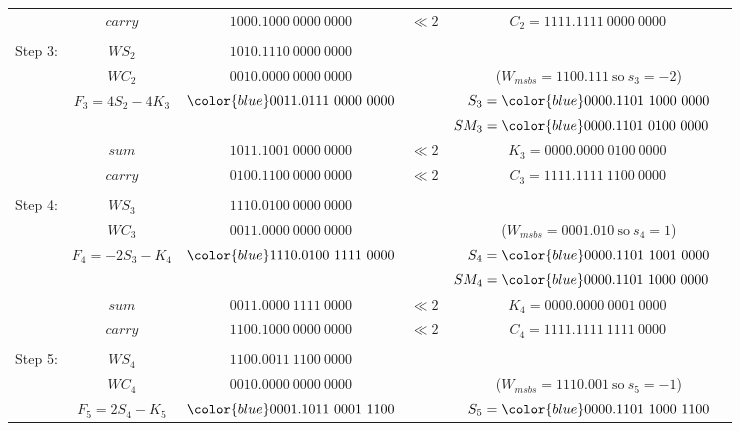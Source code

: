 \documentclass[12pt]{article}
\begin{document}
{\begin{center}
\begin{tabular}{ccccc}
            &$carry         $&$         1000.1000\ 0000\ 0000   $&$\ll2    $&$C_2=1111.1111\ 0000\ 0000\,$\\
    \hdashline\\
    Step 3: &$WS_2          $&$         1010.1110\ 0000\ 0000   $&          &\\
            &$WC_2          $&$         0010.0000\ 0000\ 0000   $&          &($W_{msbs}=1100.111\ \text{so}\ s_3=-2$)\\
            &$F_3=4S_2-4K_3$&${\color{blue}0011.0111\ 00}00\ 0000$&         &$S_3={\color{blue}0000.1101\ 10}00\ 0000$\\
            &                &                                   &          &$SM_3={\color{blue}0000.1101\ 01}00\ 0000\phantom{M}$\\
    \cline{2-3}
            &$sum           $&$         1011.1001\ 0000\ 0000   $&$\ll2    $&$K_3=0000.0000\ 0100\ 0000\ $\\
            &$carry         $&$         0100.1100\ 0000\ 0000   $&$\ll2    $&$C_3=1111.1111\ 1100\ 0000\,$\\
    \hdashline\\
    Step 4: &$WS_3          $&$         1110.0100\ 0000\ 0000   $&          &\\
            &$WC_3          $&$         0011.0000\ 0000\ 0000   $&          &($W_{msbs}=0001.010\ \text{so}\ s_4=1$)\\
            &$F_4=-2S_3-K_4$&${\color{blue}1110.0100\ 1111}\ 0000$&        &$S_4={\color{blue}0000.1101\ 1001}\ 0000$\\
            &                &                                   &          &$SM_4={\color{blue}0000.1101\ 1000}\ 0000\phantom{M}$\\
    \cline{2-3}
            &$sum           $&$         0011.0000\ 1111\ 0000   $&$\ll2    $&$K_4=0000.0000\ 0001\ 0000\ $\\
            &$carry         $&$         1100.1000\ 0000\ 0000   $&$\ll2    $&$C_4=1111.1111\ 1111\ 0000\,$\\
    \hdashline\\
    Step 5: &$WS_4          $&$         1100.0011\ 1100\ 0000   $&          &\\
            &$WC_4          $&$         0010.0000\ 0000\ 0000   $&          &($W_{msbs}=1110.001\ \text{so}\ s_5=-1$)\\
            &$F_5=2S_4-K_5 $&${\color{blue}0001.1011\ 0001\ 11}00$&        &$S_5={\color{blue}0000.1101\ 1000\ 11}00$\\

\end{tabular}
\end{center}}
\end{document}
